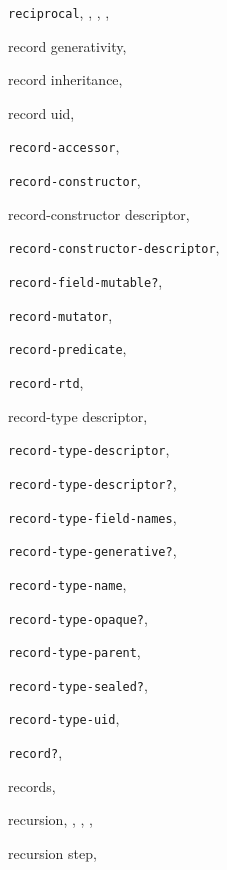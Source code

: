 {\begin{multicols}{2}
\texttt{reciprocal}, \pageref{start_s4}, \pageref{start_s109}, \pageref{start_s123}, \pageref{further_s76}
  
record generativity, \pageref{records_s3}
  
record inheritance, \pageref{records_s7}
  
record uid, \pageref{records_s6}
  
\texttt{record-accessor}, \textit{\pageref{records_s31}}
  
\texttt{record-constructor}, \textit{\pageref{records_s29}}
  
record-constructor descriptor, \pageref{records_s25}
  
\texttt{record-constructor-descriptor}, \textit{\pageref{records_s28}}
  
\texttt{record-field-mutable?}, \textit{\pageref{records_s39}}
  
\texttt{record-mutator}, \textit{\pageref{records_s32}}
  
\texttt{record-predicate}, \textit{\pageref{records_s30}}
  
\texttt{record-rtd}, \textit{\pageref{records_s41}}
  
record-type descriptor, \pageref{records_s17}
  
\texttt{record-type-descriptor}, \textit{\pageref{records_s28}}
  
\texttt{record-type-descriptor?}, \textit{\pageref{records_s23}}
  
\texttt{record-type-field-names}, \textit{\pageref{records_s38}}
  
\texttt{record-type-generative?}, \textit{\pageref{records_s37}}
  
\texttt{record-type-name}, \textit{\pageref{records_s34}}
  
\texttt{record-type-opaque?}, \textit{\pageref{records_s37}}
  
\texttt{record-type-parent}, \textit{\pageref{records_s35}}
  
\texttt{record-type-sealed?}, \textit{\pageref{records_s37}}
  
\texttt{record-type-uid}, \textit{\pageref{records_s36}}
  
\texttt{record?}, \textit{\pageref{records_s40}}
  
records, \pageref{records_s0}
  
recursion, \pageref{intro_s19}, \pageref{start_s130}, \pageref{further_s32}, \pageref{control_s23}
  
recursion step, \pageref{start_s135}
  

\end{multicols}}

